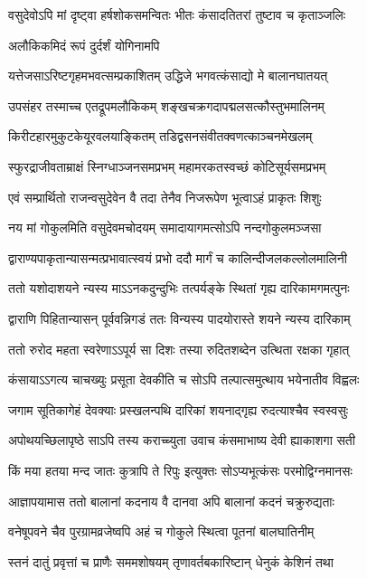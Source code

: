\twolineshloka
{वसुदेवोऽपि मां दृष्ट्वा हर्षशोकसमन्वितः}
{भीतः कंसादतितरां तुष्टाव च कृताञ्जलिः}%

\onelineshloka
{अलौकिकमिदं रूपं दुर्दर्शं योगिनामपि}%

\twolineshloka
{यत्तेजसाऽरिष्टगृहमभवत्सम्प्रकाशितम्}
{उद्धिजे भगवत्कंसाद्यो मे बालानघातयत्}%

\twolineshloka
{उपसंहर तस्माच्च एतद्रूपमलौकिकम्}
{शङ्खचक्रगदापद्मलसत्कौस्तुभमालिनम्}%

\twolineshloka
{किरीटहारमुकुटकेयूरवलयाङ्कितम्}
{तडिद्वसनसंवीतक्वणत्काञ्चनमेखलम्}%

\twolineshloka
{स्फुरद्राजीवताम्राक्षं स्निग्धाञ्जनसमप्रभम्}
{महामरकतस्वच्छं कोटिसूर्यसमप्रभम्}%

\twolineshloka
{एवं सम्प्रार्थितो राजन्वसुदेवेन वै तदा}
{तेनैव निजरूपेण भूत्वाऽहं प्राकृतः शिशुः}%

\twolineshloka
{नय मां गोकुलमिति वसुदेवमचोदयम्}
{समादायागमत्सोऽपि नन्दगोकुलमञ्जसा}%

\twolineshloka
{द्वाराण्यपाकृतान्यासन्मत्प्रभावात्स्वयं प्रभो}
{ददौ मार्गं च कालिन्दीजलकल्लोलमालिनी}%

\twolineshloka
{ततो यशोदाशयने न्यस्य माऽऽनकदुन्दुभिः}
{तत्पर्यङ्के स्थितां गृह्य दारिकामगमत्पुनः}%

\twolineshloka
{द्वाराणि पिहितान्यासन् पूर्ववन्निगडं ततः}
{विन्यस्य पादयोरास्ते शयने न्यस्य दारिकाम्}%

\twolineshloka
{ततो रुरोद महता स्वरेणाऽऽपूर्य सा दिशः}
{तस्या रुदितशब्देन उत्थिता रक्षका गृहात्}%

\twolineshloka
{कंसायाऽऽगत्य चाचख्युः प्रसूता देवकीति च}
{सोऽपि तल्पात्समुत्थाय भयेनातीव विह्वलः}%

\twolineshloka
{जगाम सूतिकागेहं देवक्याः प्रस्खलन्पथि}
{दारिकां शयनाद्गृह्य रुदत्याश्चैव स्वस्वसुः}%

\twolineshloka
{अपोथयच्छिलापृष्ठे साऽपि तस्य कराच्च्युता}
{उवाच कंसमाभाष्य देवी ह्याकाशगा सती}%

\twolineshloka
{किं मया हतया मन्द जातः कुत्रापि ते रिपुः}
{इत्युक्तः सोऽप्यभूत्कंसः परमोद्विग्नमानसः}%

\twolineshloka
{आज्ञापयामास ततो बालानां कदनाय वै}
{दानवा अपि बालानां कदनं चक्रुरुद्यताः}%

\twolineshloka
{वनेषूपवने चैव पुरग्रामव्रजेष्वपि}
{अहं च गोकुले स्थित्वा पूतनां बालघातिनीम्}%

\twolineshloka
{स्तनं दातुं प्रवृत्तां च प्राणैः सममशोषयम्}
{तृणावर्तबकारिष्टान् धेनुकं केशिनं तथा}%

